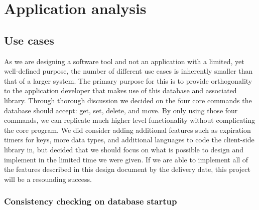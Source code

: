 \documentclass[a4paper]{report}
\begin{document}
\chapter{Application analysis}

\section{Use cases}

	\begin{center}
	\end{center}

	As we are designing a software tool and not an application with a limited, yet well-defined purpose, the number of different use cases is inherently smaller than that of a larger system. The primary purpose for this is to provide orthogonality to the application developer that makes use of this database and associated library. Through thorough discussion we decided on the four core commands the database should accept: get, set, delete, and move. By only using those four commands, we can replicate much higher level functionality without complicating the core program. We did consider adding additional features such as expiration timers for keys, more data types, and additional languages to code the client-side library in, but decided that we should focus on what is possible to design and implement in the limited time we were given. If we are able to implement all of the features described in this design document by the delivery date, this project will be a resounding success.

	\pagebreak

	\subsection{Consistency checking on database startup}
\end{document}
